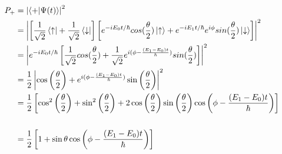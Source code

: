 \documentclass[12pt]{article}
\begin{document}
\begin{equation}
    \begin{split}
        P_+ &= \left|\braket{+|\Psi(t)}\right|^2 \\
        &= \left| \left[ \frac{1}{\sqrt{2}}\bra{\uparrow} + \frac{1}{\sqrt{2}}\bra{\downarrow}\right] \left[ e^{-iE_0t/\hbar}cos(\frac{\theta}{2})\ket{\uparrow} + e^{-iE_1t/\hbar} e^{i\phi}sin(\frac{\theta}{2})\ket{\downarrow}\right]\right|^2 \\
        &= \left|e^{-iE_0t/\hbar}\left[\frac{1}{\sqrt{2}}cos(\frac{\theta}{2}) + \frac{1}{\sqrt{2}}e^{i(\phi - \frac{(E_1 - E_0)t}{\hbar})}sin(\frac{\theta}{2})\right]\right|^2 \\
        &= \frac{1}{2}\left| \cos\left(\frac{\theta}{2}\right) + e^{i(\phi - \frac{(E_1 - E_0)t}{\hbar})} \sin\left(\frac{\theta}{2}\right) \right|^2 \\
        &= \frac{1}{2} \left[ \cos^2\left(\frac{\theta}{2}\right)  + \sin^2\left(\frac{\theta}{2}\right) + 2\cos\left(\frac{\theta}{2}\right) \sin\left(\frac{\theta}{2}\right) \cos\left(\phi - \frac{(E_1 - E_0)t}{\hbar}\right) \right] \\\\
        &= \frac{1}{2} \left[ 1 + \sin\theta \cos\left(\phi - \frac{(E_1 - E_0)t}{\hbar}\right) \right] \\
    \end{split}
\end{equation}
\end{document}

